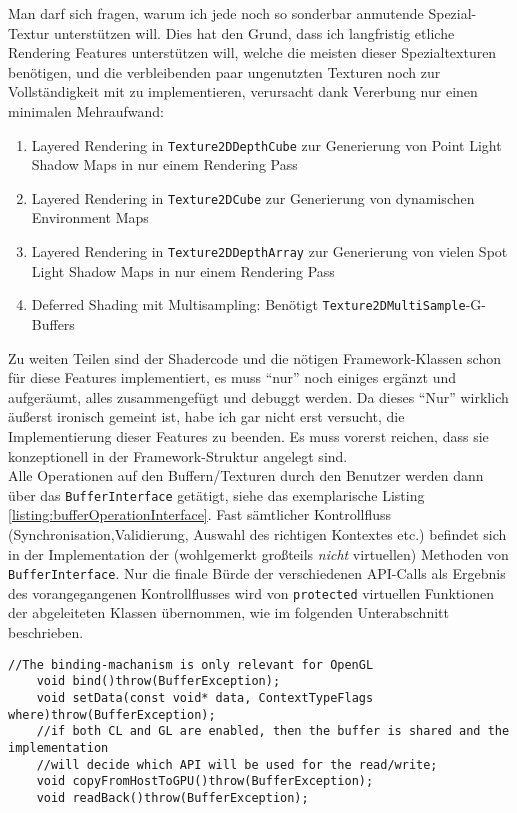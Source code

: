 	Man darf sich fragen, warum ich jede noch so sonderbar anmutende Spezial-Textur unterstützen will. Dies
	hat den Grund, dass ich langfristig etliche Rendering Features unterstützen will, welche die meisten dieser 	
	Spezialtexturen benötigen, und die verbleibenden paar ungenutzten Texturen noch zur Vollständigkeit mit zu 
	implementieren, verursacht dank Vererbung nur einen minimalen Mehraufwand:
	\begin{enumerate}
		\item Layered Rendering in \lstinline|Texture2DDepthCube| zur Generierung von Point Light Shadow Maps
		in nur einem Rendering Pass
		\item Layered Rendering in \lstinline|Texture2DCube| zur Generierung von dynamischen Environment Maps
		\item  Layered Rendering in \lstinline|Texture2DDepthArray| zur Generierung von vielen Spot Light Shadow Maps
		in nur einem Rendering Pass
		\item Deferred Shading mit Multisampling: Benötigt \lstinline|Texture2DMultiSample|-G-Buffers
	\end{enumerate}
	Zu weiten Teilen sind der Shadercode und die nötigen Framework-Klassen schon für diese Features implementiert,
	es muss "`nur"' noch einiges ergänzt und aufgeräumt, alles zusammengefügt und debuggt werden. 
	Da dieses "`Nur"' wirklich äußerst ironisch gemeint ist, habe ich gar nicht erst versucht, 
	die Implementierung dieser Features zu beenden. Es muss vorerst reichen,
	dass sie konzeptionell in der Framework-Struktur angelegt sind.\\
	
	
	
	Alle Operationen auf den Buffern/Texturen durch den Benutzer werden dann über das \lstinline|BufferInterface|
	getätigt, siehe das exemplarische Listing \ref{listing:bufferOperationInterface}. 
	Fast sämtlicher Kontrollfluss (Synchronisation,Validierung, Auswahl des richtigen Kontextes etc.)
	befindet sich in der Implementation	der (wohlgemerkt großteils \emph{nicht} virtuellen) 
	Methoden von \lstinline|BufferInterface|. 
	Nur die finale Bürde der verschiedenen API-Calls als Ergebnis des vorangegangenen Kontrollflusses
	wird von \lstinline|protected| virtuellen Funktionen der abgeleiteten Klassen übernommen, wie im folgenden 	
	Unterabschnitt beschrieben.
	
\begin{lstlisting}[caption={Operationen auf dem BufferInterface, Ausschnitt},label=listing:bufferOperationInterface]		
	//The binding-machanism is only relevant for OpenGL	
	void bind()throw(BufferException);
	void setData(const void* data, ContextTypeFlags where)throw(BufferException);
	//if both CL and GL are enabled, then the buffer is shared and the implementation
	//will decide which API will be used for the read/write;
	void copyFromHostToGPU()throw(BufferException);
	void readBack()throw(BufferException);
\end{lstlisting}
	
